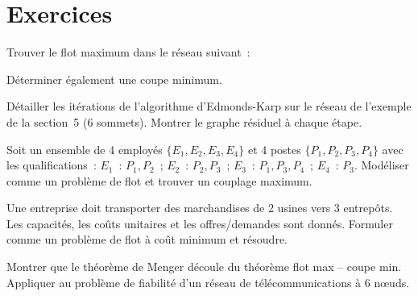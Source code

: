 \section{Exercices}

\begin{exercice}
Trouver le flot maximum dans le r\'eseau suivant~:
\begin{center}
\end{center}
D\'eterminer \'egalement une coupe minimum.
\end{exercice}

\begin{exercice}
D\'etailler les it\'erations de l'algorithme d'Edmonds-Karp sur le r\'eseau de
l'exemple de la section~5 (6 sommets). Montrer le graphe r\'esiduel \`a chaque
\'etape.
\end{exercice}

\begin{exercice}
Soit un ensemble de 4 employ\'es $\{E_1, E_2, E_3, E_4\}$ et 4 postes
$\{P_1, P_2, P_3, P_4\}$ avec les qualifications~: $E_1$~: $P_1, P_2$~;
$E_2$~: $P_2, P_3$~; $E_3$~: $P_1, P_3, P_4$~; $E_4$~: $P_3$.
Mod\'eliser comme un probl\`eme de flot et trouver un couplage maximum.
\end{exercice}

\begin{exercice}
Une entreprise doit transporter des marchandises de 2 usines vers 3 entrep\^ots.
Les capacit\'es, les co\^uts unitaires et les offres/demandes sont donn\'es.
Formuler comme un probl\`eme de flot \`a co\^ut minimum et r\'esoudre.
\end{exercice}

\begin{exercice}
Montrer que le th\'eor\`eme de Menger d\'ecoule du th\'eor\`eme flot max --
coupe min. Appliquer au probl\`eme de fiabilit\'e d'un r\'eseau de
t\'el\'ecommunications \`a 6 n\oe uds.
\end{exercice}
